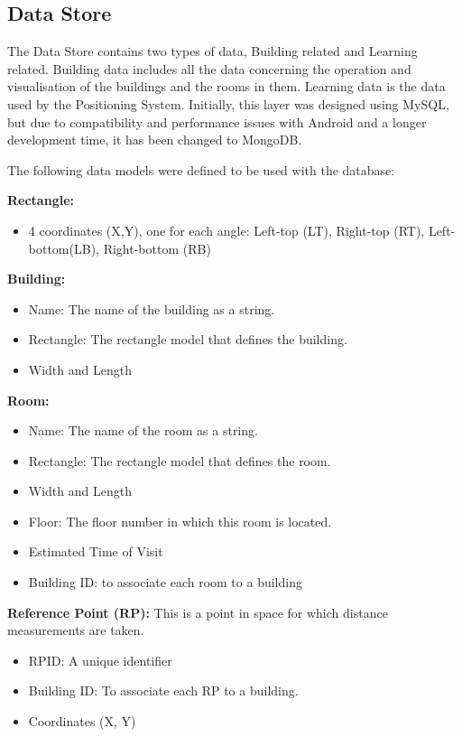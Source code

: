 \subsection{Data Store}
The Data Store contains two types of data, Building related and Learning related. 
Building data includes all the data concerning the operation and visualisation of the buildings and the rooms in them. Learning data is the data used by the Positioning System.
Initially, this layer was designed using MySQL, but due to compatibility and performance issues with Android and a longer development time, it has been changed to MongoDB.
\pagebreak

The following data models were defined to be used with the database:

\textbf{Rectangle:}	
\begin{itemize}
	\item 4 coordinates (X,Y), one for each angle: Left-top (LT), Right-top (RT), Left-bottom(LB), Right-bottom (RB)
\end{itemize}

\textbf{Building:}
\begin{itemize}
	\item Name: The name of the building as a string.
	\item Rectangle: The rectangle model that defines the building.
	\item Width and Length
\end{itemize}


\textbf{Room:} 
\begin{itemize}
	\item Name: The name of the room as a string.
	\item Rectangle: The rectangle model that defines the room.
	\item Width and Length
	\item Floor: The floor number in which this room is located.
	\item Estimated Time of Visit
	\item Building ID: to associate each room to a building
\end{itemize}

\textbf{Reference Point (RP):} This is a point in space for which distance measurements are taken.
\begin{itemize}
	\item RPID: A unique identifier
	\item Building ID: To associate each RP to a building.
	\item Coordinates (X, Y)
\end{itemize}

